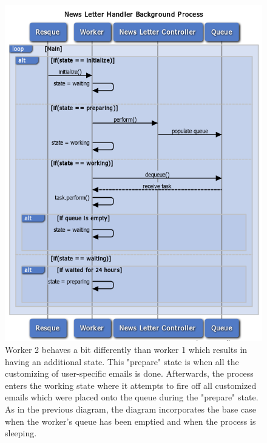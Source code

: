 \begin{figure}[!h]
\centering
\includegraphics[width=5.5in]{./Diagrams/ComponentModels/stateMachineDiagrams/Worker2/worker2.png}
\caption{Worker 2 behaves a bit differently than worker 1 which results in having an additional state. This "prepare" state is when all the customizing of user-specific emails is done. Afterwards, the process enters the working state where it attempts to fire off all customized emails which were placed onto the queue during the "prepare" state. As in the previous diagram, the diagram incorporates the base case when the worker's queue has been emptied and when the process is sleeping.}
\end{figure}

